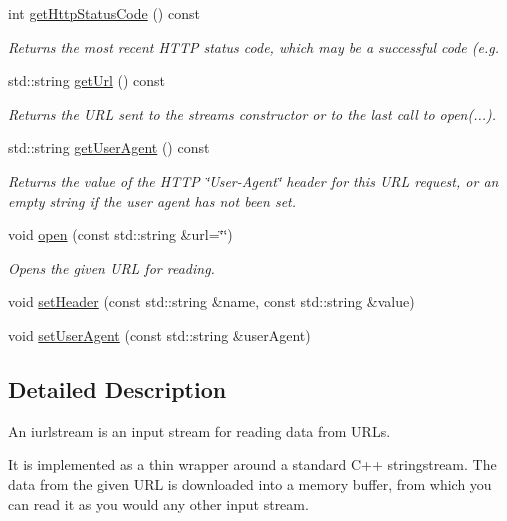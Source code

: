 \begin{DoxyCompactItemize}
int \mbox{\hyperlink{classiurlstream_ab6c069ef77f1319830dcfd90eed6a2ce}{get\+Http\+Status\+Code}} () const
\begin{DoxyCompactList}\small\item\em Returns the most recent H\+T\+TP status code, which may be a successful code (e.\+g. \end{DoxyCompactList}\item 
std\+::string \mbox{\hyperlink{classiurlstream_a0cbda75589e2fb500bbe875b72f66682}{get\+Url}} () const
\begin{DoxyCompactList}\small\item\em Returns the U\+RL sent to the stream\textquotesingle{}s constructor or to the last call to open(...). \end{DoxyCompactList}\item 
std\+::string \mbox{\hyperlink{classiurlstream_a479f109234aad1c792be804bf6320c62}{get\+User\+Agent}} () const
\begin{DoxyCompactList}\small\item\em Returns the value of the H\+T\+TP \char`\"{}\+User-\/\+Agent\char`\"{} header for this U\+RL request, or an empty string if the user agent has not been set. \end{DoxyCompactList}\item 
void \mbox{\hyperlink{classiurlstream_a9759fd1c1bf1427fa02340c2dabd47d6}{open}} (const std\+::string \&url=\char`\"{}\char`\"{})
\begin{DoxyCompactList}\small\item\em Opens the given U\+RL for reading. \end{DoxyCompactList}\item 
void \mbox{\hyperlink{classiurlstream_af7065da3945b84ffb547b8bad9ddf8dc}{set\+Header}} (const std\+::string \&name, const std\+::string \&value)
\item 
void \mbox{\hyperlink{classiurlstream_a766286050e9b8fe08919f8353ecb4031}{set\+User\+Agent}} (const std\+::string \&user\+Agent)
\end{DoxyCompactItemize}


\subsection{Detailed Description}
An {\ttfamily iurlstream} is an input stream for reading data from U\+R\+Ls. 

It is implemented as a thin wrapper around a standard C++ stringstream. The data from the given U\+RL is downloaded into a memory buffer, from which you can read it as you would any other input stream. 

